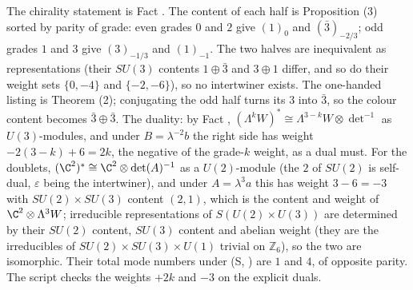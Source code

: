 The chirality statement is Fact . The content of each half is Proposition (3) sorted by parity of grade: even grades $0$ and $2$ give $(1)_{0}$ and $(\bar{3})_{-2/3}$; odd grades $1$ and $3$ give $(3)_{-1/3}$ and $(1)_{-1}$. The two halves are inequivalent as representations (their $SU(3)$ contents $1 \oplus \bar{3}$ and $3 \oplus 1$ differ, and so do their weight sets $\{0, -4\}$ and $\{-2, -6\}$), so no intertwiner exists. The one-handed listing is Theorem (2); conjugating the odd half turns its $3$ into $\bar{3}$, so the colour content becomes $\bar{3} \oplus \bar{3}$. The duality: by Fact , $(\Lambda^{k}W)^{*} \cong \Lambda^{3-k}W \otimes \det^{-1}$ as $U(3)$-modules, and under $B = \lambda^{-2}b$ the right side has weight $-2(3-k) + 6 = 2k$, the negative of the grade-$k$ weight, as a dual must. For the doublets, $(\C^{2})^{*} \cong \C^{2} \otimes \det(A)^{-1}$ as a $U(2)$-module (the $2$ of $SU(2)$ is self-dual, $\varepsilon$ being the intertwiner), and under $A = \lambda^{3}a$ this has weight $3 - 6 = -3$ with $SU(2) \times SU(3)$ content $(2, 1)$, which is the content and weight of $\C^{2} \otimes \Lambda^{3}W$; irreducible representations of $S(U(2) \times U(3))$ are determined by their $SU(2)$ content, $SU(3)$ content and abelian weight (they are the irreducibles of $SU(2) \times SU(3) \times U(1)$ trivial on $\mathbb{Z}_{6}$), so the two are isomorphic. Their total mode numbers under (S, ) are $1$ and $4$, of opposite parity. The script checks the weights $+2k$ and $-3$ on the explicit duals.
